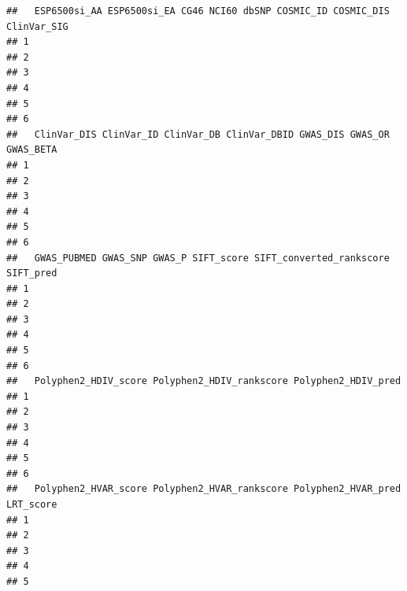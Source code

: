 \documentclass[
]{article}
\begin{document}
\begin{verbatim}
##   ESP6500si_AA ESP6500si_EA CG46 NCI60 dbSNP COSMIC_ID COSMIC_DIS ClinVar_SIG
## 1                                                                            
## 2                                                                            
## 3                                                                            
## 4                                                                            
## 5                                                                            
## 6                                                                            
##   ClinVar_DIS ClinVar_ID ClinVar_DB ClinVar_DBID GWAS_DIS GWAS_OR GWAS_BETA
## 1                                                                          
## 2                                                                          
## 3                                                                          
## 4                                                                          
## 5                                                                          
## 6                                                                          
##   GWAS_PUBMED GWAS_SNP GWAS_P SIFT_score SIFT_converted_rankscore SIFT_pred
## 1                                                                          
## 2                                                                          
## 3                                                                          
## 4                                                                          
## 5                                                                          
## 6                                                                          
##   Polyphen2_HDIV_score Polyphen2_HDIV_rankscore Polyphen2_HDIV_pred
## 1                                                                  
## 2                                                                  
## 3                                                                  
## 4                                                                  
## 5                                                                  
## 6                                                                  
##   Polyphen2_HVAR_score Polyphen2_HVAR_rankscore Polyphen2_HVAR_pred LRT_score
## 1                                                                            
## 2                                                                            
## 3                                                                            
## 4                                                                            
## 5                                                                            

\end{verbatim}
\end{document}
